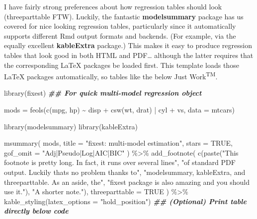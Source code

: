 \documentclass[
]{article}
\newenvironment{Shaded}{\begin{snugshade}}{\end{snugshade}}
\newcommand{\AttributeTok}[1]{\textcolor[rgb]{0.77,0.63,0.00}{#1}}
\newcommand{\ConstantTok}[1]{\textcolor[rgb]{0.00,0.00,0.00}{#1}}
\newcommand{\DocumentationTok}[1]{\textcolor[rgb]{0.56,0.35,0.01}{\textbf{\textit{#1}}}}
\newcommand{\FunctionTok}[1]{\textcolor[rgb]{0.00,0.00,0.00}{#1}}
\newcommand{\NormalTok}[1]{#1}
\newcommand{\OtherTok}[1]{\textcolor[rgb]{0.56,0.35,0.01}{#1}}
\newcommand{\SpecialCharTok}[1]{\textcolor[rgb]{0.00,0.00,0.00}{#1}}
\newcommand{\StringTok}[1]{\textcolor[rgb]{0.31,0.60,0.02}{#1}}
\begin{document}
I have fairly strong preferences about how regression tables should look
(threeparttable FTW). Luckily, the fantastic \textbf{modelsummary}
package has us covered for nice looking regression tables, particularly
since it automatically supports different Rmd output formats and
backends. (For example, via the equally excellent \textbf{kableExtra}
package.) This makes it easy to produce regression tables that look good
in both HTML and PDF\ldots{} although the latter requires that the
corresponding LaTeX packages be loaded first. This template loads those
LaTeX packages automatically, so tables like the below Just
Work\textsuperscript{TM}.

\begin{Shaded}
\begin{Highlighting}[]
\FunctionTok{library}\NormalTok{(fixest) }\DocumentationTok{\#\# For quick multi{-}model regression object}

\NormalTok{mods }\OtherTok{=} \FunctionTok{feols}\NormalTok{(}\FunctionTok{c}\NormalTok{(mpg, hp) }\SpecialCharTok{\textasciitilde{}}\NormalTok{ disp }\SpecialCharTok{+} \FunctionTok{csw}\NormalTok{(wt, drat) }\SpecialCharTok{|}\NormalTok{ cyl }\SpecialCharTok{+}\NormalTok{ vs, }\AttributeTok{data =}\NormalTok{ mtcars)}

\FunctionTok{library}\NormalTok{(modelsummary)}
\FunctionTok{library}\NormalTok{(kableExtra)}

\FunctionTok{msummary}\NormalTok{(}
\NormalTok{  mods, }
  \AttributeTok{title =} \StringTok{"fixest: multi{-}model estimation"}\NormalTok{, }
  \AttributeTok{stars =} \ConstantTok{TRUE}\NormalTok{,}
  \AttributeTok{gof\_omit =} \StringTok{"Adj|Pseudo|Log|AIC|BIC"}
\NormalTok{  ) }\SpecialCharTok{\%\textgreater{}\%}
  \FunctionTok{add\_footnote}\NormalTok{(}
    \FunctionTok{c}\NormalTok{(}\FunctionTok{paste}\NormalTok{(}\StringTok{"This footnote is pretty long. In fact, it runs over several lines"}\NormalTok{,}
          \StringTok{"of standard PDF output. Luckily that\textquotesingle{}s no problem thanks to"}\NormalTok{,}
          \StringTok{"modelsummary, kableExtra, and threeparttable. As an aside, the"}\NormalTok{,}
          \StringTok{"fixest package is also amazing and you should use it."}\NormalTok{),}
      \StringTok{"A shorter note."}\NormalTok{),}
    \AttributeTok{threeparttable =} \ConstantTok{TRUE}
\NormalTok{    ) }\SpecialCharTok{\%\textgreater{}\%}
  \FunctionTok{kable\_styling}\NormalTok{(}\AttributeTok{latex\_options =} \StringTok{"hold\_position"}\NormalTok{) }\DocumentationTok{\#\# (Optional) Print table directly below code}
\end{Highlighting}
\end{Shaded}
\end{document}
